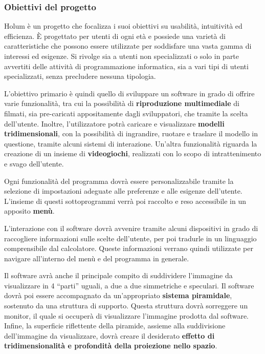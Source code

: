 \subsubsection*{Obiettivi del progetto}

Holum è un progetto che focalizza i suoi obiettivi su usabilità, intuitività ed efficienza. È progettato per utenti di ogni età e possiede una varietà di caratteristiche che possono essere utilizzate per soddisfare una vasta gamma di interessi ed esigenze. Si rivolge sia a utenti non specializzati o solo in parte avvertiti delle attività di programmazione informatica, sia a vari tipi di utenti specializzati, senza precludere nessuna tipologia.

L’obiettivo primario è quindi quello di sviluppare un software in grado di offrire varie funzionalità, tra cui la possibilità di {\bfseries riproduzione multimediale} di filmati, sia pre-\/caricati appositamente dagli sviluppatori, che tramite la scelta dell’utente. Inoltre, l’utilizzatore potrà caricare e visualizzare {\bfseries modelli tridimensionali}, con la possibilità di ingrandire, ruotare e traslare il modello in questione, tramite alcuni sistemi di interazione. Un’altra funzionalità riguarda la creazione di un insieme di {\bfseries videogiochi}, realizzati con lo scopo di intrattenimento e svago dell’utente.

Ogni funzionalità del programma dovrà essere personalizzabile tramite la selezione di impostazioni adeguate alle preferenze e alle esigenze dell’utente. L’insieme di questi sottoprogrammi verrà poi raccolto e reso accessibile in un apposito {\bfseries menù}.

L’interazione con il software dovrà avvenire tramite alcuni dispositivi in grado di raccogliere informazioni sulle scelte dell’utente, per poi tradurle in un linguaggio comprensibile dal calcolatore. Queste informazioni verrano quindi utilizzate per navigare all’interno del menù e del programma in generale.

Il software avrà anche il principale compito di suddividere l’immagine da visualizzare in 4 “parti” uguali, a due a due simmetriche e speculari. Il software dovrà poi essere accompagnato da un’appropriato {\bfseries sistema piramidale}, sostenuto da una struttura di supporto. Questa struttura dovrà sorreggere un monitor, il quale si occuperà di visualizzare l’immagine prodotta dal software. Infine, la superficie riflettente della piramide, assieme alla suddivisione dell’immagine da visualizzare, dovrà creare il desiderato {\bfseries effetto di tridimensionalità e profondità della proiezione nello spazio}.

